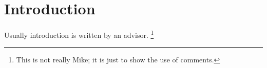 \section{Introduction}
\label{sec:intro}

Usually introduction is written by an advisor.  
\footnote{This is not really Mike; it is just to show the 
use of comments.}




